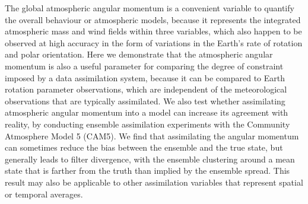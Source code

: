 The global atmospheric angular momentum is a convenient variable to quantify the overall behaviour or atmospheric models, because it represents the integrated atmospheric mass and wind fields within three variables, which also happen to be observed at high accuracy in the form of variations in the Earth's rate of rotation and polar orientation. 
%
Here we demonstrate that the atmospheric angular momentum is also a useful parameter for comparing the degree of constraint imposed by a data assimilation system, because it can be compared to Earth rotation parameter observations, which are independent of the meteorological observations that are typically assimilated.  
%
We also test whether assimilating atmospheric angular momentum into a model can increase its agreement with reality, by conducting ensemble assimilation experiments with the Community Atmosphere Model 5 (CAM5). 
We find that assimilating the angular momentum can sometimes reduce the bias between the ensemble and the true state, but generally leads to filter divergence, with the ensemble clustering around a mean state that is farther from the truth than implied by the ensemble spread. 
This result may also be applicable to other assimilation variables that represent spatial or temporal averages. 
